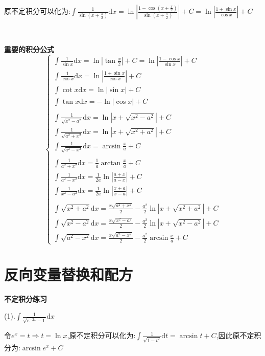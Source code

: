 \documentclass[oneside]{book}
\begin{document}
	原不定积分可以化为:$\int \frac{1}{\sin(x+\frac{\pi}{2})}\mathrm{d}x=\ln|\frac{1-\cos (x+\frac{\pi}{2})}{\sin(x+\frac{\pi}{2})}|+C=\ln|\frac{1+\sin x}{\cos x}|+C$
	
	\hspace{\fill}\
	
	\textbf{重要的积分公式}
	\begin{equation}
		\left\{\begin{array}{c}
		\int\frac{1}{\sin x}\mathrm{d}x=\ln|\tan \frac{x}{2}|+C=\ln|\frac{1-\cos x}{\sin x}|+C\\\int \frac{1}{\cos x}\mathrm{d}x=\ln|\frac{1+\sin x}{\cos x}|+C
		\\\int\cot x\mathrm{d}x=\ln|\sin x|+C\\\int \tan x\mathrm{d}x=-\ln|\cos x|+C
		\\\\\int \frac{1}{\sqrt{x^{2}-a^{2}}}\mathrm{d}x=\ln|x+\sqrt{x^{2}-a^{2}}|+C\\\int \frac{1}{\sqrt{a^{2}+x^{2}}}\mathrm{d}x=\ln|x+\sqrt{x^{2}+a^{2}}|+C\\\int \frac{1}{\sqrt{a^{2}-x^{2}}}\mathrm{d}x=\arcsin\frac{x}{a}+C\\\\\int \frac{1}{a^{2}+x^{2}}\mathrm{d}x=\frac{1}{a}\arctan\frac{x}{a}+C\\\int \frac{1}{a^{2}-x^{2}}\mathrm{d}x=\frac{1}{2a}\ln|\frac{a+x}{a-x}|+C\\\int \frac{1}{x^{2}-a^{2}}\mathrm{d}x=\frac{1}{2a}\ln|\frac{x+a}{x-a}|+C\\\\\int \sqrt{x^{2}+a^{2}}\mathrm{d}x=\frac{x\sqrt{a^{2}+x^{2}}}{2}-\frac{a^{2}}{2}\ln|x+\sqrt{x^{2}+a^{2}}|+C\\\int \sqrt{x^{2}-a^{2}}\mathrm{d}x=\frac{x\sqrt{x^{2}-a^{2}}}{2}-\frac{a^{2}}{2}\ln|x+\sqrt{x^{2}-a^{2}}|+C\\\int \sqrt{a^{2}-x^{2}}\mathrm{d}x=\frac{x\sqrt{a^{2}-x^{2}}}{2}-\frac{a^{2}}{2}\arcsin\frac{x}{a}+C
		\end{array}\right.
	\end{equation}
	\chapter{反向变量替换和配方}
	\textbf{不定积分练习}
	
	(1).$\int \frac{1}{\sqrt{e^{-2x}-1}}\mathrm{d}x$
	
	令$e^{x}=t\Rightarrow t=\ln x$,原不定积分可以化为:$\int \frac{1}{\sqrt{1-t^{2}}}\mathrm{d}t=\arcsin t+C$,因此原不定积分为:$\arcsin e^{x}+C$
	
\end{document}
